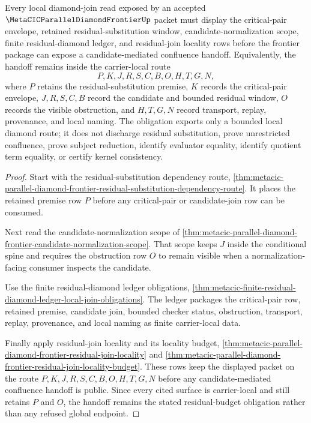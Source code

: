 \begin{theorem}
\label{thm:metacic-parallel-diamond-residual-budget-obligation}
Every local diamond-join read exposed by an accepted $\MetaCICParallelDiamondFrontierUp$ packet must display the critical-pair envelope, retained residual-substitution window, candidate-normalization scope, finite residual-diamond ledger, and residual-join locality rows before the frontier package can expose a candidate-mediated confluence handoff. Equivalently, the handoff remains inside the carrier-local route
$$
P,K,J,R,S,C,B,O,H,T,G,N ,
$$
where $P$ retains the residual-substitution premise, $K$ records the critical-pair envelope, $J,R,S,C,B$ record the candidate and bounded residual window, $O$ records the visible obstruction, and $H,T,G,N$ record transport, replay, provenance, and local naming. The obligation exports only a bounded local diamond route; it does not discharge residual substitution, prove unrestricted confluence, prove subject reduction, identify evaluator equality, identify quotient term equality, or certify kernel consistency.
\end{theorem}
\begin{proof}
Start with the residual-substitution dependency route, \autoref{thm:metacic-parallel-diamond-frontier-residual-substitution-dependency-route}. It places the retained premise row $P$ before any critical-pair or candidate-join row can be consumed.

Next read the candidate-normalization scope of \autoref{thm:metacic-parallel-diamond-frontier-candidate-normalization-scope}. That scope keeps $J$ inside the conditional spine and requires the obstruction row $O$ to remain visible when a normalization-facing consumer inspects the candidate.

Use the finite residual-diamond ledger obligations, \autoref{thm:metacic-finite-residual-diamond-ledger-local-join-obligations}. The ledger packages the critical-pair row, retained premise, candidate join, bounded checker status, obstruction, transport, replay, provenance, and local naming as finite carrier-local data.

Finally apply residual-join locality and its locality budget, \autoref{thm:metacic-parallel-diamond-frontier-residual-join-locality} and \autoref{thm:metacic-parallel-diamond-frontier-residual-join-locality-budget}. These rows keep the displayed packet on the route $P,K,J,R,S,C,B,O,H,T,G,N$ before any candidate-mediated confluence handoff is public. Since every cited surface is carrier-local and still retains $P$ and $O$, the handoff remains the stated residual-budget obligation rather than any refused global endpoint.
\end{proof}

